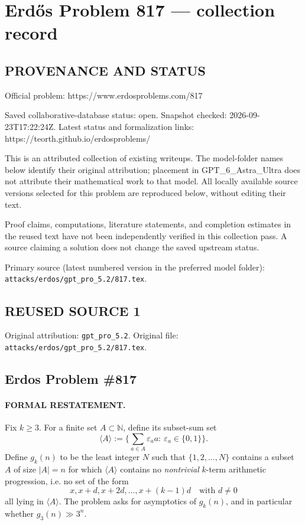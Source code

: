 \section*{Erd\H{o}s Problem 817 --- collection record}

\subsection*{PROVENANCE AND STATUS}
Official problem: https://www.erdosproblems.com/817

Saved collaborative-database status: open.
Snapshot checked: 2026-09-23T17:22:24Z.
Latest status and formalization links: https://teorth.github.io/erdosproblems/

This is an attributed collection of existing writeups. The model-folder names below identify their original attribution; placement in GPT\_6\_Astra\_Ultra does not attribute their mathematical work to that model. All locally available source versions selected for this problem are reproduced below, without editing their text.

Proof claims, computations, literature statements, and completion estimates in the reused text have not been independently verified in this collection pass. A source claiming a solution does not change the saved upstream status.

Primary source (latest numbered version in the preferred model folder): \texttt{attacks/erdos/gpt\_pro\_5.2/817.tex}.

\subsection*{REUSED SOURCE 1}
Original attribution: \texttt{gpt\_pro\_5.2}.
Original file: \texttt{attacks/erdos/gpt\_pro\_5.2/817.tex}.

\subsection*{Erdos Problem \#817}

\paragraph{FORMAL RESTATEMENT.}
Fix $k\ge 3$. For a finite set $A\subset\mathbb{N}$, define its subset-sum set
\[
\langle A\rangle := \Big\{\sum_{a\in A}\varepsilon_a a:\ \varepsilon_a\in\{0,1\}\Big\}.
\]
Define $g_k(n)$ to be the least integer $N$ such that $\{1,2,\dots,N\}$ contains a subset $A$ of size $|A|=n$ for which $\langle A\rangle$ contains no \emph{nontrivial} $k$-term arithmetic progression, i.e. no set of the form
\[
x, x+d, x+2d,\dots,x+(k-1)d\quad\text{with }d\ne0
\]
all lying in $\langle A\rangle$.
The problem asks for asymptotics of $g_k(n)$, and in particular whether $g_3(n)\gg 3^n$.

